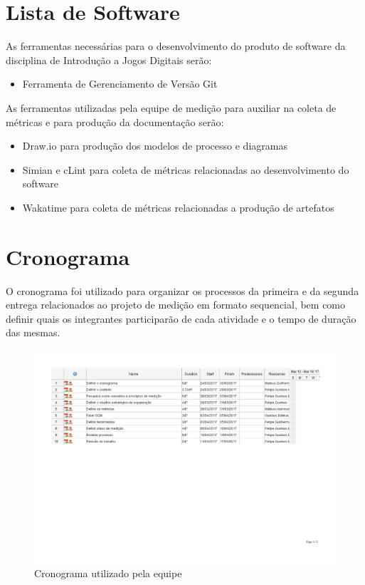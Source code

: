\section{Lista de Software}
	As ferramentas necessárias para o desenvolvimento do produto de software da disciplina de Introdução a Jogos Digitais serão: 
	\begin{itemize}
		\item Ferramenta de Gerenciamento de Versão Git

	\end{itemize}
	
	As ferramentas utilizadas pela equipe de medição para auxiliar na coleta de métricas e para produção da documentação serão:
	
	\begin{itemize}
		\item Draw.io para produção dos modelos de processo e diagramas
		\item Simian e cLint para coleta de métricas relacionadas ao desenvolvimento do software
		\item Wakatime para coleta de métricas relacionadas a produção de artefatos
	\end{itemize}
	
\section{Cronograma}
	O cronograma foi utilizado para organizar os processos da primeira e da segunda entrega relacionados ao projeto de medição em formato sequencial, bem como definir quais os integrantes participarão de cada atividade e o tempo de duração das mesmas.
	\begin{figure}[!htpb]
		\centering
		\includegraphics [scale=0.35]{figuras/processo/cronograma}
		\caption{Cronograma utilizado pela equipe}
	\end{figure}
	\newpage
